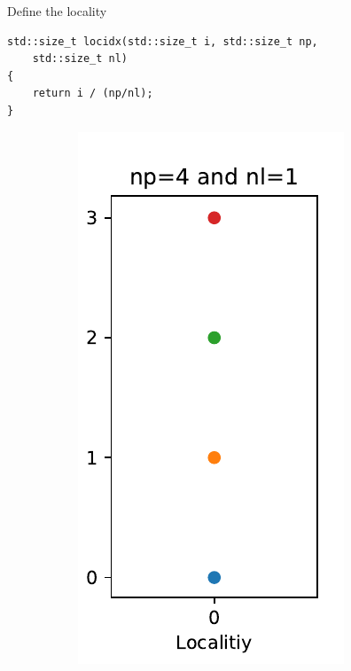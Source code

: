 \documentclass[\classoption]{beamer}
\begin{document}
\begin{frame}[fragile]{Define the locality}

\begin{lstlisting}
std::size_t locidx(std::size_t i, std::size_t np, 
	std::size_t nl)
{
    return i / (np/nl);
}
\end{lstlisting}
\vspace{-0.75cm}
\begin{figure}
    \centering
    \begin{subfigure}[b]{0.3\textwidth}
        \includegraphics[width=\textwidth]{./images/partition2}

\end{subfigure}
\end{figure}
\end{frame}
\end{document}
